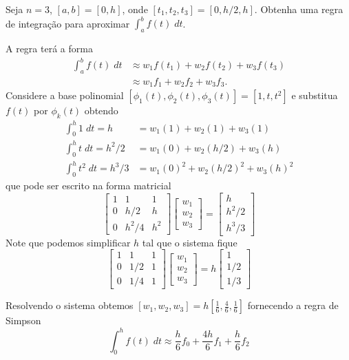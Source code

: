 \begin{ex}
Seja $n=3$, $[a,b]=[0,h]$, onde $[t_1,t_2,t_3]=[0,h/2,h]$. Obtenha uma regra de integração para aproximar $\int _a^b f(t)\;dt$.
\end{ex}
\begin{sol}
A regra terá a forma
\begin{align}
  \int _a^b f(t)\;dt & \approx w_1f(t_1)+w_2f(t_2)+w_3f(t_3)\\
                 & \approx w_1f_1   +w_2f_2   +w_3f_3.
\end{align}
Considere a base polinomial $[\phi _1(t),\phi _2(t),\phi _3(t)]=[1,t,t^2]$ e substitua $f(t)$ por $\phi_k(t)$ obtendo
\begin{align}
   \int _0^h 1   \;dt = h     &=  w_1(1)   +w_2(1)     + w_3(1) \\
   \int _0^h t   \;dt = h^2/2 &=  w_1(0)   +w_2(h/2)   + w_3(h) \\
   \int _0^h t^2 \;dt = h^3/3 &=  w_1(0)^2 +w_2(h/2)^2 + w_3(h)^2
\end{align}
que pode ser escrito na forma matricial
\begin{equation}
\begin{bmatrix}
    1  &  1    &  1 \\
    0  &  h/2    & h  \\
    0  &  h^2/4    & h^2
\end{bmatrix}
\begin{bmatrix}
 w_1 \\ w_2\\ w_3
\end{bmatrix}
=
\begin{bmatrix}
 h  \\ h^2/2 \\ h^3/3
\end{bmatrix}
\end{equation}
Note que podemos simplificar $h$ tal que o sistema fique
\begin{equation}
\begin{bmatrix}
    1  &  1    &  1 \\
    0  &  1/2  & 1  \\
    0  &  1/4  & 1
\end{bmatrix}
\begin{bmatrix}
 w_1 \\ w_2\\ w_3
\end{bmatrix}
=
h
\begin{bmatrix}
 1  \\ 1/2 \\ 1/3
\end{bmatrix}
\end{equation}

Resolvendo o sistema obtemos $\displaystyle [w_1,w_2,w_3]=h[\frac{1}{6},\frac{4}{6},\frac{1}{6}]$ fornecendo a regra de Simpson
\begin{equation}
  \int _0^h f(t) \;dt \approx  \frac{h}{6}f_0+\frac{4h}{6}f_1+\frac{h}{6}f_2
\end{equation}
\end{sol}

